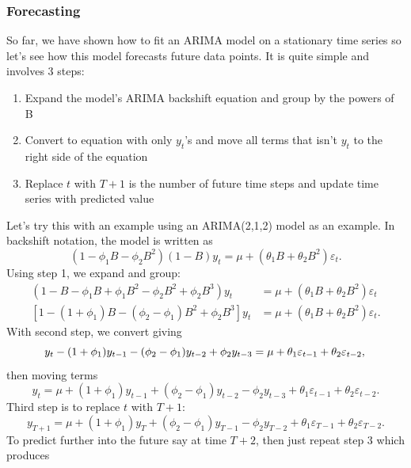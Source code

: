 \documentclass{article}
\begin{document}
  \subsubsection{Forecasting}
  So far, we have shown how to fit an ARIMA model on a stationary time series so let's see how this model forecasts future data points. It is quite simple and involves 3 steps:
  \begin{enumerate}
    \item Expand the model's ARIMA backshift equation and group by the powers of B
    \item Convert to equation with only $y_t$'s and move all terms that isn't $y_t$ to the right side of the equation
    \item Replace $t$ with $T+1$ is the number of future time steps and update time series with predicted value
  \end{enumerate}
  Let's try this with an example using an ARIMA(2,1,2) model as an example. In backshift notation, the model is written as
  \begin{equation*}
    (1 - \phi_1B - \phi_2B^2)(1-B)y_t = \mu + (\theta_1B + \theta_2B^2)\varepsilon_t.
  \end{equation*}
  Using step 1, we expand and group:
  \begin{align*}
    (1 - B - \phi_1B + \phi_1B^2 - \phi_2B^2 + \phi_2B^3)y_t &= \mu + (\theta_1B + \theta_2B^2)\varepsilon_t\\
    [1 - (1 + \phi_1)B - (\phi_2 - \phi_1)B^2 + \phi_2B^3]y_t &= \mu + (\theta_1B + \theta_2B^2)\varepsilon_t.
  \end{align*}
  With second step, we convert giving
  \begin{equation*}
    y_t - (1 + \phi_1)y_{t-1} - (\phi_2 - \phi_1)y_{t-2} + \phi_2y_{t-3} = \mu + \theta_1\varepsilon_{t-1} + \theta_2\varepsilon_{t-2},\\
  \end{equation*}
  then moving terms
  \begin{equation*}
    y_t = \mu + (1 + \phi_1)y_{t-1} + (\phi_2 - \phi_1)y_{t-2} - \phi_2y_{t-3} + \theta_1\varepsilon_{t-1} + \theta_2\varepsilon_{t-2}.
  \end{equation*}
  Third step is to replace $t$ with $T+1$:
  \begin{equation*}
    y_{T+1} = \mu + (1 + \phi_1)y_{T} + (\phi_2 - \phi_1)y_{T-1} - \phi_2y_{T-2} + \theta_1\varepsilon_{T-1} + \theta_2\varepsilon_{T-2}.
  \end{equation*}
  To predict further into the future say at time $T+2$, then just repeat step 3 which produces
\end{document}
